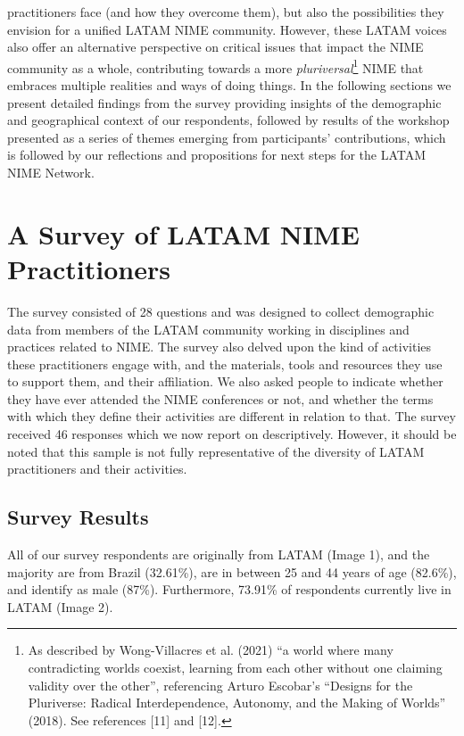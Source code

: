 \documentclass[sigconf]{nimeart}
\begin{document}
practitioners face (and how they overcome them), but also the possibilities they envision for a unified LATAM NIME community. However, these LATAM voices also offer an alternative perspective on critical issues that impact the NIME community as a whole, contributing towards a more \emph{pluriversal}\footnote{As described by Wong-Villacres et al. (2021) ``a world where many contradicting worlds coexist, learning from each other without one claiming validity over the other'', referencing Arturo Escobar's ``Designs for the Pluriverse: Radical Interdependence, Autonomy, and the Making of Worlds'' (2018). See references {[}11{]} and {[}12{]}.} \cite{escobardesigns,wong2021lessons}NIME that embraces multiple realities and ways of doing things. In the following sections we present detailed findings from the survey providing insights of the demographic and geographical context of our respondents, followed by results of the workshop presented as a series of themes emerging from participants' contributions, which is followed by our reflections and propositions for next steps for the LATAM NIME Network.

\section{A Survey of LATAM NIME Practitioners}\label{a-survey-of-latam-nime-practitioners}

The survey consisted of 28 questions and was designed to collect demographic data from members of the LATAM community working in disciplines and practices related to NIME. The survey also delved upon the kind of activities these practitioners engage with, and the materials, tools and resources they use to support them, and their affiliation. We also asked people to indicate whether they have ever attended the NIME conferences or not, and whether the terms with which they define their activities are different in relation to that. The survey received 46 responses which we now report on descriptively. However, it should be noted that this sample is not fully representative of the diversity of LATAM practitioners and their activities.

\subsection{Survey Results}\label{survey-results}

All of our survey respondents are originally from LATAM (Image 1), and the majority are from Brazil (32.61\%), are in between 25 and 44 years of age (82.6\%), and identify as male (87\%). Furthermore, 73.91\% of respondents currently live in LATAM (Image 2). \textbf{}
\end{document}
